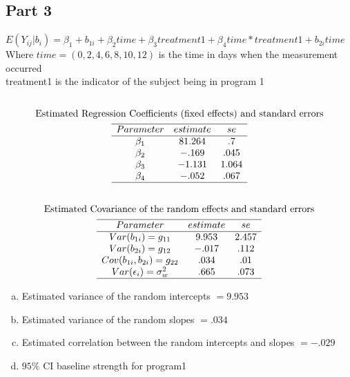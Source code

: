 \documentclass{article}
\newcommand{\sg}{\sigma}
\begin{document}
\begin{flushleft}
\subsection*{Part 3}
$E(Y_{ij}|b_i)=\beta_1+b_{1i}+\beta_2 time+\beta_3 treatment1 +\beta_4 time*treatment1+b_{2i}time$\\
Where $time=(0,2,4,6,8,10,12)$ is the time in days when the measurement occurred\\
treatment1 is the indicator of the subject being in program 1
\begin{multline*}\\
\text{Estimated Regression Coefficients (fixed effects) and standard errors}\\
\begin{array}{ccc}
\hline
Parameter & estimate & se\\
\hline
\beta_1& 81.264 & .7\\
\beta_2& -.169 &.045\\
\beta_3&-1.131&1.064 \\
\beta_4&-.052&.067 \\
\hline
\end{array}\\
\end{multline*}
\begin{multline*}\\
\text{Estimated Covariance of the random effects and standard errors}\\
\begin{array}{ccc}
\hline
Parameter & estimate & se\\
\hline
Var(b_{1i})=g_{11}& 9.953& 2.457\\
Var(b_{2i})=g_{12}& -.017& .112 \\
Cov(b_{1i},b_{2i})=g_{22} &.034& .01\\
Var(\epsilon_i)=\sg^2_w& .665 & .073\\
\hline
\end{array}\\
\end{multline*}
\begin{enumerate}[(a)]
\item
Estimated variance of the random intercepts $= 9.953$
\item
Estimated variance of the random slopes $= .034$
\item
Estimated correlation between the random intercepts and
slopes $= -.029$
\item
$95\%$ CI baseline strength for program1\\

\end{enumerate}
\end{flushleft}
\end{document}
